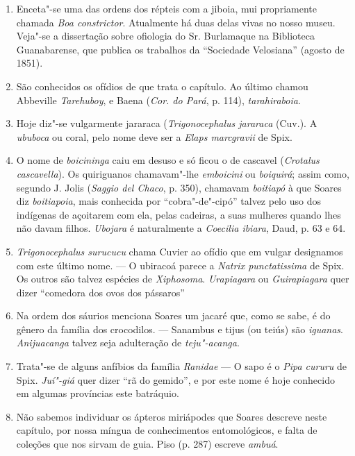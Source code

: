 \begin{enumerate}
\item Enceta"-se uma das ordens dos répteis com a jiboia, mui propriamente chamada  \textit{Boa constrictor}. 
Atualmente há duas delas vivas no nosso museu. Veja"-se a dissertação 
sobre ofiologia do Sr. Burlamaque na Biblioteca Guanabarense, que publica os 
trabalhos da ``Sociedade Velosiana'' (agosto de 1851).

\item São conhecidos os ofídios de que trata o capítulo. Ao último chamou Abbeville  
\textit{Tarehuboy}, e Baena (\textit{Cor. do Pará}, p. 114), \textit{tarahiraboia}.

\item Hoje diz"-se vulgarmente jararaca (\textit{Trigonocephalus jararaca} (Cuv.). A \textit{ububoca} 
ou coral, pelo nome deve ser a \textit{Elaps marcgravii} de Spix.

\item O nome de \textit{boicininga} caiu em desuso e só ficou o de cascavel (\textit{Crotalus cascavella}). 
Os quiriguanos chamavam"-lhe \textit{emboicini} ou \textit{boiquirá}; assim como, 
segundo J. Jolis (\textit{Saggio del Chaco}, p. 350), chamavam \textit{boitiapó} à que Soares diz 
\textit{boitiapoia}, mais conhecida por ``cobra"-de"-cipó''  talvez pelo uso dos indígenas de 
açoitarem com ela, pelas cadeiras, a suas mulheres quando lhes não davam filhos.
\textit{Ubojara} é naturalmente a \textit{Coecilia ibiara}, Daud, p. 63 e 64.

\item \textit{Trigonocephalus surucucu} chama Cuvier ao ofídio que em vulgar designamos 
com este último nome. --- O ubiracoá parece a \textit{Natrix punctatissima} de Spix. Os outros 
são talvez espécies de \textit{Xiphosoma}. \textit{Urapiagara} ou \textit{Guirapiagara} quer dizer ``comedora 
dos ovos dos pássaros'' 

\item Na ordem dos sáurios menciona Soares um jacaré que, como se sabe, é do gênero 
da família dos crocodilos. --- Sanambus e tijus (ou teiús) são \textit{iguanas}. \textit{Anijuacanga} 
talvez seja adulteração de \textit{teju"-acanga}.

\item Trata"-se de alguns anfíbios da família \textit{Ranidae} --- O sapo é o \textit{Pipa cururu} de Spix.  
\textit{Juí"-giá} quer dizer ``rã do gemido'', e por este nome é hoje conhecido em algumas 
províncias este batráquio.

\item Não sabemos individuar os ápteros miriápodes que Soares descreve neste 
capítulo, por nossa míngua de conhecimentos entomológicos, e falta de coleções que 
nos sirvam de guia. Piso (p. 287) escreve \textit{ambuá}.


\end{enumerate}
